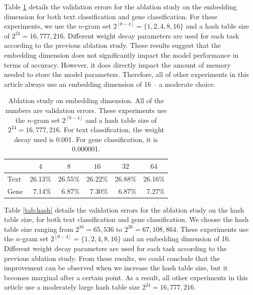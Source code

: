 \documentclass{article}
\begin{document}
Table \ref{tab:embed} details the validation errors for the ablation study on the embedding dimension for both text classification and gene classification. For these experiments, we use the \(n\)-gram set \(2^{[0-4]}=\{1,2,4,8,16\}\) and a hash table size of \(2^{24} = 16,777,216\). Different weight decay parameters are used for each task according to the previous ablation study. These results suggest that the embedding dimension does not significantly impact the model performance in terms of accuracy. However, it does directly impact the amount of memory needed to store the model parameters. Therefore, all of other experiments in this article always use an embedding dimension of 16 -- a moderate choice.

\begin{table}[h]
  \caption{Ablation study on embedding dimension. All of the numbers are validation errors. These experiments use the \(n\)-gram set \(2^{[0-4]}\) and a hash table size of \(2^{24} = 16,777,216\). For text classification, the weight decay used is 0.001. For gene classification, it is 0.000001.}
  \label{tab:embed}
  \begin{center}
    \begin{tabular}{lrrrrr}
      \hline
      &
      \multicolumn{1}{c}{\(4\)} &
      \multicolumn{1}{c}{\(8\)} &
      \multicolumn{1}{c}{\(16\)} &
      \multicolumn{1}{c}{\(32\)} & \multicolumn{1}{c}{\(64\)} \\ \hline
      Text & 26.13\% & 26.55\% & 26.22\% & 26.88\% & 26.16\% \\
      Gene & 7.14\% & 6.87\% & 7.30\% & 6.87\% & 7.27\% \\
    \hline
    \end{tabular}
  \end{center}
\end{table}

Table \ref{tab:hash} details the validation errors for the ablation study on the hash table size, for both text classification and gene classification. We choose the hash table size ranging from \(2^{16}=65,536\) to \(2^{26}=67,108,864\). These experiments use the \(n\)-gram set \(2^{[0-4]}=\{1,2,4,8,16\}\) and an embedding dimension of 16. Different weight decay parameters are used for each task according to the previous ablation study. From these results, we could conclude that the improvement can be observed when we increase the hash table size, but it becomes marginal after a certain point. As a result, all other experiments in this article use a moderately large hash table size \(2^{24}=16,777,216\).
\end{document}
